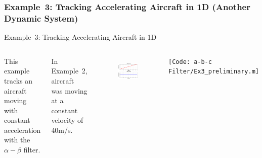 \subsubsection{Example~3: Tracking Accelerating Aircraft in 1D (Another Dynamic System)}
\begin{frame}{Example~3: Tracking Accelerating Aircraft in 1D}
\begin{columns}
    This example tracks an aircraft moving with constant acceleration with the $\alpha-\beta$ filter.
    
    \vspace{5pt}
    
    In Example~2, aircraft was moving at a constant velocity of 40m/s. 
        \begin{figure}
	    \centering
	    \includegraphics[width=1\textwidth]{Figures/Chapter1/ex3_preliminary1.eps}
	    \label{fig:ex3_preliminary1}
	    \vspace{-8pt}
	\end{figure}
        \texttt{\tiny [Code: a-b-c Filter/Ex3\_preliminary.m]}
    

\end{columns}
\end{frame}
